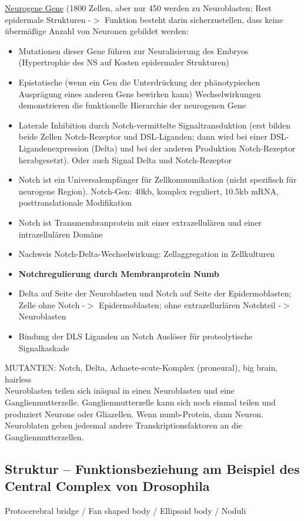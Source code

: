 \underline{Neurogene Gene} (1800 Zellen, aber nur 450 werden zu Neuroblasten; Rest epidermale Strukturen -$>$ Funktion besteht darin sicherzustellen, dass keine übermäßige Anzahl von  Neuronen gebildet werden:
\begin{itemize}
	\item Mutationen dieser Gene führen zur Neuralisierung des Embryos (Hypertrophie des NS auf Kosten epidermaler Strukturen)
	\item Epistatische (wenn ein Gen die Unterdrückung der phänotypischen Ausprägung eines anderen Gens bewirken kann) Wechselwirkungen demonstrieren die funktionelle Hierarchie der neurogenen Gene
	\item Laterale Inhibition durch Notch-vermittelte Signaltransduktion (erst bilden beide Zellen Notch-Rezeptor und DSL-Liganden; dann wird bei einer DSL-Ligandenexpression (Delta) und bei der anderen Produktion Notch-Rezeptor herabgesetzt). Oder auch Signal Delta und Notch-Rezeptor
	\item Notch ist ein Universalempfänger für Zellkommunikation (nicht spezifisch für neurogene Region). Notch-Gen: 40kb, komplex reguliert, 10.5kb mRNA, posttranslationale Modifikation
	\item Notch ist Transmembranprotein mit einer extrazellulären und einer intrazellulären Domäne
	\item Nachweis Notch-Delta-Wechselwirkung: Zellaggregation in Zellkulturen
	\item \textbf{Notchregulierung durch Membranprotein Numb}
	\item Delta auf Seite der Neuroblasten und Notch auf Seite der Epidermoblasten; Zelle ohne Notch -$>$ Epidermoblasten; ohne extrazellurlären Notchteil -$>$ Neuroblasten
	\item Bindung der DLS Liganden an Notch Auslöser für proteolytische Signalkaskade
\end{itemize}

MUTANTEN: Notch, Delta, Achaete-scute-Komplex (proneural), big brain, hairless\\

Neuroblasten teilen sich inäqual in einen Neuroblasten und eine Ganglienmutterzelle. Ganglienmutterzelle kann sich noch einmal teilen und produziert Neurone oder Gliazellen. Wenn numb-Protein, dann Neuron. Neuroblaten geben jedesmal andere Transkriptionsfaktoren an die Ganglienmutterzellen.

\subsection{Struktur – Funktionsbeziehung am Beispiel des Central Complex von Drosophila}
Protocerebral bridge / Fan shaped body / Ellipsoid body / Noduli


